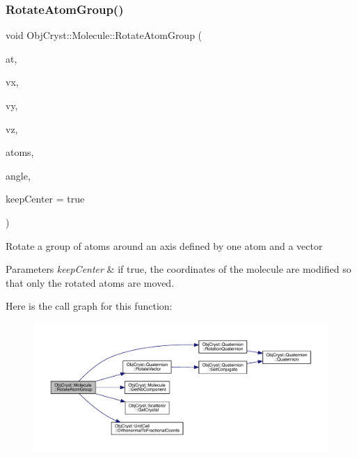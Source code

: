 \subsubsection{\texorpdfstring{RotateAtomGroup()}{RotateAtomGroup()}\hspace{0.1cm}{\footnotesize\ttfamily [2/2]}}
{\footnotesize\ttfamily void Obj\+Cryst\+::\+Molecule\+::\+Rotate\+Atom\+Group (\begin{DoxyParamCaption}\item[{const \mbox{\hyperlink{class_obj_cryst_1_1_mol_atom}{Mol\+Atom}} \&}]{at,  }\item[{const R\+E\+AL}]{vx,  }\item[{const R\+E\+AL}]{vy,  }\item[{const R\+E\+AL}]{vz,  }\item[{const set$<$ \mbox{\hyperlink{class_obj_cryst_1_1_mol_atom}{Mol\+Atom}} $\ast$ $>$ \&}]{atoms,  }\item[{const R\+E\+AL}]{angle,  }\item[{const bool}]{keep\+Center = {\ttfamily true} }\end{DoxyParamCaption})}

Rotate a group of atoms around an axis defined by one atom and a vector


\begin{DoxyParams}{Parameters}
{\em keep\+Center} & if true, the coordinates of the molecule are modified so that only the rotated atoms are moved. \\
\hline
\end{DoxyParams}
Here is the call graph for this function\+:
\nopagebreak
\begin{figure}[H]
\begin{center}
\leavevmode
\includegraphics[width=350pt]{class_obj_cryst_1_1_molecule_a84e93db5b81b90fd5befa22caaf8691c_cgraph}
\end{center}
\end{figure}
\mbox{\label{class_obj_cryst_1_1_molecule_a24043736cd4323a31b7bc0fa6fa166da}} 
